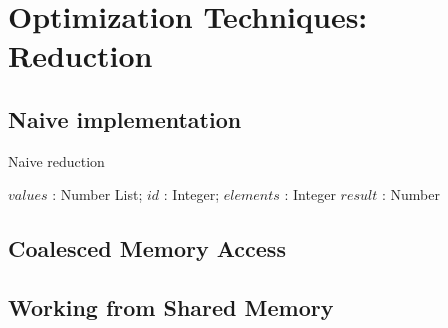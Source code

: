 



\section{Optimization Techniques: Reduction}




\subsection{Naive implementation}

\begin{algorithm}
  \caption{Naive reduction}
  \label{alg:KDRestart}
  \begin{algorithmic}
              {$values$ : Number List; $id$ : Integer; $elements$ : Integer}
              {$result$ : Number}
              {
                  \ENDIF
                  \SYNC
                \ENDWHILE
                \ENDIF
              }
  \end{algorithmic}
\end{algorithm}


\subsection{Coalesced Memory Access}


\subsection{Working from Shared Memory}

